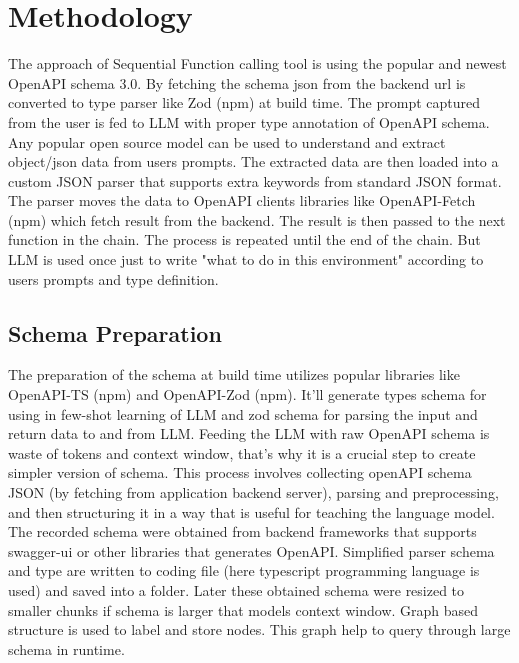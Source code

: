 \documentclass[conference]{IEEEtran}
\begin{document}
\section{Methodology}
The approach of Sequential Function calling tool is using the popular and newest OpenAPI schema 3.0. By fetching the schema json from the backend url is converted to type parser like Zod (npm) at build time. The prompt captured from the user is fed to LLM with proper type annotation of OpenAPI schema. Any popular open source model can be used to understand and extract object/json data from users prompts. The extracted data are then loaded into a custom JSON parser that supports extra keywords from standard JSON format. The parser moves the data to OpenAPI clients libraries like OpenAPI-Fetch (npm) which fetch result from the backend. The result is then passed to the next function in the chain. The process is repeated until the end of the chain. But LLM is used once just to write "what to do in this environment" according to users prompts and type definition.

\subsection{Schema Preparation}\label{AA}
The preparation of the schema at build time utilizes popular libraries like OpenAPI-TS (npm) and OpenAPI-Zod (npm). It'll generate types schema for using in few-shot learning of LLM and zod schema for parsing the input and return data to and from LLM. Feeding the LLM with raw OpenAPI schema is waste of tokens and context window, that's why it is a crucial step to create simpler version of schema. This process involves collecting openAPI schema JSON (by fetching from application backend server), parsing and preprocessing, and then structuring it in a way that is useful for teaching the language model. The recorded schema were obtained from backend frameworks that supports swagger-ui or other libraries that generates OpenAPI. Simplified parser schema and type are written to coding file (here typescript programming language is used) and saved into a folder. Later these obtained schema were resized to smaller chunks if schema is larger that models context window. Graph based structure is used to label and store nodes. This graph help to query through large schema in runtime. 
\end{document}
